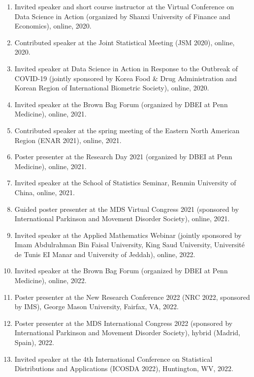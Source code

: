 \documentclass[12pt]{article}
\begin{document}
\begin{enumerate}
		\item Invited speaker and short course instructor at the Virtual Conference on Data Science in Action (organized by Shanxi 	University of Finance and Economics), online, 2020.
		
		\item Contributed speaker at the Joint Statistical Meeting (JSM 2020), online, 2020.
		
		\item Invited speaker at Data Science in Action in Response to the Outbreak of COVID-19 (jointly sponsored by Korea Food \& Drug Administration and	Korean Region of International Biometric Society), online, 2020.
		
		\item Invited speaker at the Brown Bag Forum (organized by DBEI at Penn Medicine), online, 2021.
		
		\item Contributed speaker at the spring meeting of the Eastern North American Region (ENAR 2021), online, 2021.
		
		\item Poster presenter at the Research Day 2021 (organized by DBEI at Penn Medicine), online, 2021.
		
		\item Invited speaker at the School of Statistics Seminar, 
		Renmin University of China, online, 2021.
		
		\item Guided poster presenter at the MDS Virtual Congress 2021 (sponsored by International Parkinson and Movement Disorder Society), online, 2021.
		
		\item Invited speaker at the Applied Mathematics Webinar 
		(jointly sponsored by Imam Abdulrahman Bin Faisal University, King Saud University, Universit\'{e} de Tunis EI Manar and University of Jeddah), online, 2022.
		
		\item Invited speaker at the Brown Bag Forum (organized by DBEI at Penn Medicine), online, 2022.
		
		\item Poster presenter at the New Research Conference 2022 
		(NRC 2022, sponsored by IMS), George Mason University, Fairfax, VA, 2022.
	
		\item Poster presenter at the MDS International Congress 2022 (sponsored by International Parkinson and Movement Disorder Society), hybrid (Madrid, Spain), 2022.
		
		\item Invited speaker at the 4th International Conference on Statistical Distributions and Applications (ICOSDA 2022), Huntington, WV, 2022. 
		
	
	
	
		
		
		
	
		
	
		
		
		
	
		
		
		
		
		
		
	\end{enumerate}
	
\end{document}

